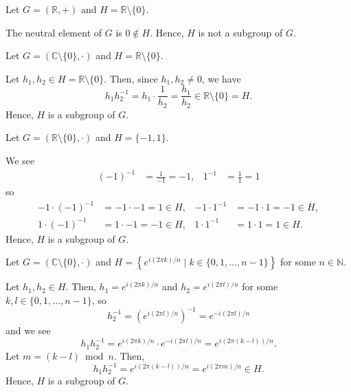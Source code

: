 \begin{exer}
Let $ G=(\mathbb{R},+) $ and $ H=\mathbb{R}\setminus\{0\} $.
\end{exer}
\begin{sltn}
The neutral element of $ G $ is $ 0\notin H $. Hence, $ H $ is not a subgroup of $ G $.
\end{sltn}

\begin{exer}
Let $ G=(\mathbb{C}\setminus\{0\},\cdot) $ and $ H=\mathbb{R}\setminus\{0\} $.
\end{exer}
\begin{sltn}
Let $ h_1,h_2\in H=\mathbb{R}\setminus\{0\} $. Then, since $ h_1,h_2\neq 0 $, we have
\begin{equation*}
    h_1h_2^{-1}=h_1\cdot\frac{1}{h_2}=\frac{h_1}{h_2}\in\mathbb{R}\setminus\{0\}=H.
\end{equation*}
Hence, $ H $ is a subgroup of $ G $.
\end{sltn}

\begin{exer}
Let $ G=(\mathbb{R}\setminus\{0\},\cdot) $ and $ H=\{-1,1\} $.
\end{exer}
\begin{sltn}
We see
\begin{align*}
    (-1)^{-1}&=\frac{1}{-1}=-1, & 1^{-1}&=\frac{1}{1}=1
\end{align*}
so
\begin{align*}
    -1\cdot(-1)^{-1}&=-1\cdot-1=1\in H, & -1\cdot 1^{-1}&=-1\cdot 1=-1\in H, \\
    1\cdot(-1)^{-1}&=1\cdot-1=-1\in H, & 1\cdot 1^{-1}&=1\cdot 1=1\in H.
\end{align*}
Hence, $ H $ is a subgroup of $ G $.
\end{sltn}

\begin{exer}
Let $ G=(\mathbb{C}\setminus\{0\},\cdot) $ and $ H=\left\{e^{i(2\pi k)/n}\mid k\in\{0,1,\ldots,n-1\}\right\} $ for some $ n\in\mathbb{N} $.
\end{exer}
\begin{sltn}
Let $ h_1,h_2\in H $. Then, $ h_1=e^{i(2\pi k)/n} $ and $ h_2=e^{i(2\pi l)/n} $ for some $ k,l\in\{0,1,\ldots,n-1\} $, so
\begin{equation*}
    h_2^{-1}=\left(e^{i(2\pi l)/n}\right)^{-1}=e^{-i(2\pi l)/n}
\end{equation*}
and we see
\begin{equation*}
    h_1h_2^{-1}=e^{i(2\pi k)/n}\cdot e^{-i(2\pi l)/n}=e^{i(2\pi(k-l))/n}.
\end{equation*}
Let $ m=(k-l)\bmod n $. Then,
\begin{equation*}
    h_1h_2^{-1}=e^{i(2\pi(k-l))/n}=e^{i(2\pi m)/n}\in H.
\end{equation*}
Hence, $ H $ is a subgroup of $ G $.
\end{sltn}

